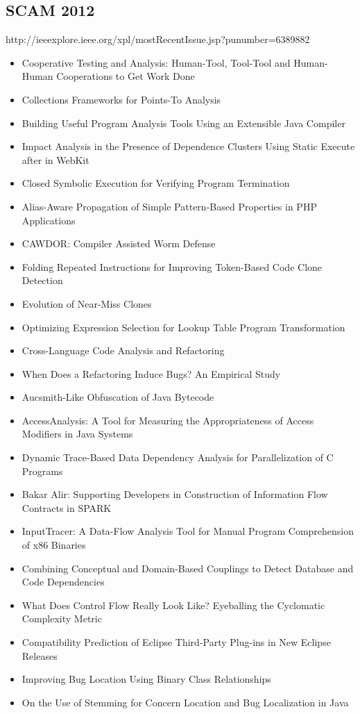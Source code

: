 \subsection{SCAM 2012}

http://ieeexplore.ieee.org/xpl/mostRecentIssue.jsp?punumber=6389882

{\small
\begin{itemize}[itemsep=-1ex]
  \item Cooperative Testing and Analysis: Human-Tool, Tool-Tool and Human-Human Cooperations to Get Work Done
  \item Collections Frameworks for Points-To Analysis
  \item Building Useful Program Analysis Tools Using an Extensible Java Compiler
  \item Impact Analysis in the Presence of Dependence Clusters Using Static Execute after in WebKit
  \item Closed Symbolic Execution for Verifying Program Termination
  \item Alias-Aware Propagation of Simple Pattern-Based Properties in PHP Applications
  \item CAWDOR: Compiler Assisted Worm Defense
  \item Folding Repeated Instructions for Improving Token-Based Code Clone Detection
  \item Evolution of Near-Miss Clones
  \item Optimizing Expression Selection for Lookup Table Program Transformation
  \item Cross-Language Code Analysis and Refactoring
  \item When Does a Refactoring Induce Bugs? An Empirical Study
  \item Aucsmith-Like Obfuscation of Java Bytecode
  \item AccessAnalysis: A Tool for Measuring the Appropriateness of Access Modifiers in Java Systems
  \item Dynamic Trace-Based Data Dependency Analysis for Parallelization of C Programs
  \item Bakar Alir: Supporting Developers in Construction of Information Flow Contracts in SPARK
  \item InputTracer: A Data-Flow Analysis Tool for Manual Program Comprehension of x86 Binaries
  \item Combining Conceptual and Domain-Based Couplings to Detect Database and Code Dependencies
  \item What Does Control Flow Really Look Like? Eyeballing the Cyclomatic Complexity Metric
  \item Compatibility Prediction of Eclipse Third-Party Plug-ins in New Eclipse Releases
  \item Improving Bug Location Using Binary Class Relationships
  \item On the Use of Stemming for Concern Location and Bug Localization in Java
\end{itemize}
}

